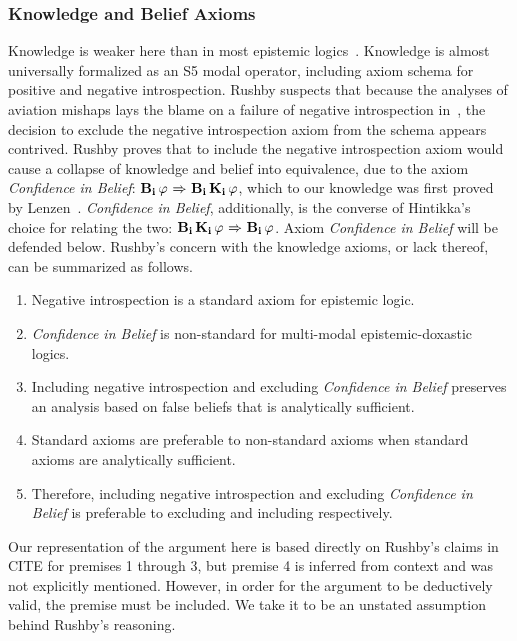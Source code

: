 \subsubsection*{Knowledge and Belief Axioms}
Knowledge is weaker here than in most epistemic logics~\cite{FHMV,DEL,Hintikka}. Knowledge is almost universally formalized as an S5 modal operator, including axiom schema for positive and negative introspection. Rushby suspects that because the analyses of aviation mishaps lays the blame on a failure of negative introspection in~\cite{AhrenbachGoodloe}, the decision to exclude the negative introspection axiom from the schema appears contrived. Rushby proves that to include the negative introspection axiom would cause a collapse of knowledge and belief into equivalence, due to the axiom \emph{Confidence in Belief}: $\mathbf{B}_{\mathbf{i}}\,\varphi {\ \Rightarrow \ } \mathbf{B}_{\mathbf{i}}\,\mathbf{K}_{\mathbf{i}}\,\varphi$, which to our knowledge was first proved by Lenzen~\cite{Lenzen}. \emph{Confidence in Belief}, additionally, is the converse of Hintikka's choice for relating the two: $\mathbf{B}_{\mathbf{i}}\,\mathbf{K}_{\mathbf{i}}\,\varphi {\ \Rightarrow \ } \mathbf{B}_{\mathbf{i}}\,\varphi$. Axiom \emph{Confidence in Belief} will be defended below. Rushby's concern with the knowledge axioms, or lack thereof, can be summarized as follows.

\begin{enumerate}
	\item Negative introspection is a standard axiom for epistemic logic.
	\item \emph{Confidence in Belief} is non-standard for multi-modal epistemic-doxastic logics.
	\item Including negative introspection and excluding \emph{Confidence in Belief} preserves an analysis based on false beliefs that is analytically sufficient.
	\item Standard axioms are preferable to non-standard axioms when standard axioms are analytically sufficient.
	\item Therefore, including negative introspection and excluding \emph{Confidence in Belief} is preferable to excluding and including respectively.
\end{enumerate}

Our representation of the argument here is based directly on Rushby's claims in CITE for premises 1 through 3, but premise 4 is inferred from context and was not explicitly mentioned. However, in order for the argument to be deductively valid, the premise must be included. We take it to be an unstated assumption behind Rushby's reasoning.

